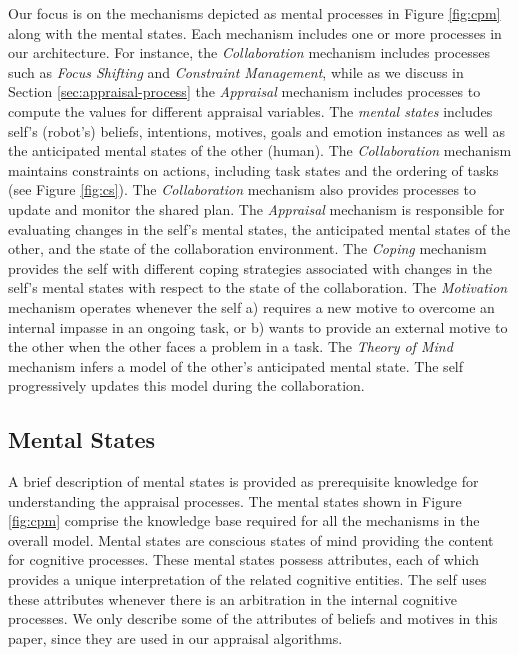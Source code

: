 \documentclass{article}
\begin{document}
Our focus is on the mechanisms depicted as mental processes in Figure
\ref{fig:cpm} along with the mental states. Each mechanism includes one or
more processes in our architecture. For instance, the \textit{Collaboration}
mechanism includes processes such as \textit{Focus Shifting} and
\textit{Constraint Management}, while as we discuss in Section
\ref{sec:appraisal-process} the \textit{Appraisal} mechanism includes processes
to compute the values for different appraisal variables. The \textit{mental
states} includes self's (robot's) beliefs, intentions, motives, goals and
emotion instances as well as the anticipated mental states of the other (human).
The \textit{Collaboration} mechanism maintains constraints on actions, including
task states and the ordering of tasks (see Figure \ref{fig:cs}). The
\textit{Collaboration} mechanism also provides processes to update and monitor
the shared plan. The \textit{Appraisal} mechanism is responsible for evaluating
changes in the self's mental states, the anticipated mental states of the other,
and the state of the collaboration environment. The \textit{Coping} mechanism
provides the self with different coping strategies associated with changes in
the self's mental states with respect to the state of the collaboration. The
\textit{Motivation} mechanism operates whenever the self a) requires a new
motive to overcome an internal impasse in an ongoing task, or b) wants to
provide an external motive to the other when the other faces a problem in a
task. The \textit{Theory of Mind} mechanism infers a model of the other's
anticipated mental state. The self progressively updates this model during the
collaboration.

\subsection{Mental States}
\label{sec:mental-states}

A brief description of mental states is provided as prerequisite knowledge for
understanding the appraisal processes. The mental states shown in Figure
\ref{fig:cpm} comprise the knowledge base required for all the mechanisms in the
overall model. Mental states are conscious states of mind providing the content
for cognitive processes. These mental states possess attributes, each of which
provides a unique interpretation of the related cognitive entities. The self
uses these attributes whenever there is an arbitration in the internal cognitive
processes. We only describe some of the attributes of beliefs and motives in
this paper, since they are used in our appraisal algorithms.
\end{document}

